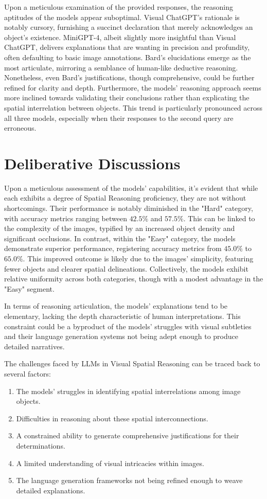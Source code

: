 \documentclass[twocolumn,11pt]{report}
\begin{document}
Upon a meticulous examination of the provided responses, the reasoning aptitudes of the models appear suboptimal. Visual ChatGPT's rationale is notably cursory, furnishing a succinct declaration that merely acknowledges an object's existence. MiniGPT-4, albeit slightly more insightful than Visual ChatGPT, delivers explanations that are wanting in precision and profundity, often defaulting to basic image annotations. Bard's elucidations emerge as the most articulate, mirroring a semblance of human-like deductive reasoning. Nonetheless, even Bard's justifications, though comprehensive, could be further refined for clarity and depth. Furthermore, the models' reasoning approach seems more inclined towards validating their conclusions rather than explicating the spatial interrelation between objects. This trend is particularly pronounced across all three models, especially when their responses to the second query are erroneous.

\section{Deliberative Discussions}

Upon a meticulous assessment of the models' capabilities, it's evident that while each exhibits a degree of Spatial Reasoning proficiency, they are not without shortcomings. Their performance is notably diminished in the "Hard" category, with accuracy metrics ranging between $42.5\%$ and $57.5\%$. This can be linked to the complexity of the images, typified by an increased object density and significant occlusions. In contrast, within the "Easy" category, the models demonstrate superior performance, registering accuracy metrics from $45.0\%$ to $65.0\%$. This improved outcome is likely due to the images' simplicity, featuring fewer objects and clearer spatial delineations. Collectively, the models exhibit relative uniformity across both categories, though with a modest advantage in the "Easy" segment.

In terms of reasoning articulation, the models' explanations tend to be elementary, lacking the depth characteristic of human interpretations. This constraint could be a byproduct of the models' struggles with visual subtleties and their language generation systems not being adept enough to produce detailed narratives.

The challenges faced by LLMs in Visual Spatial Reasoning can be traced back to several factors:
\begin{enumerate}
    \item The models' struggles in identifying spatial interrelations among image objects.
    \item Difficulties in reasoning about these spatial interconnections.
    \item A constrained ability to generate comprehensive justifications for their determinations.
    \item A limited understanding of visual intricacies within images.
    \item The language generation frameworks not being refined enough to weave detailed explanations.
\end{enumerate}
\end{document}
